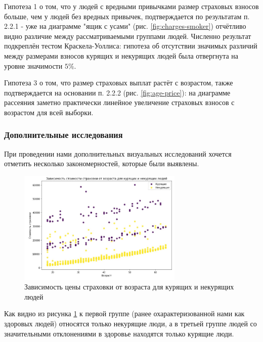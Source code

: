\documentclass[a4paper,12pt]{article}
\begin{document}
Гипотеза 1 о том, что у людей с вредными привычками размер страховых взносов больше, чем у людей без вредных привычек, подтверждается по результатам п. 2.2.1 - уже на диаграмме "ящик с усами" (рис. \ref{fig:charges-smoker}) отчётливо видно различие между рассматриваемыми группами людей. Численно результат подкреплён тестом Краскела-Уоллиса: гипотеза об отсутствии значимых различий между размерами взносов курящих и некурящих людей была отвергнута на уровне значимости $5\%$.

Гипотеза 3 о том, что размер страховых выплат растёт с возрастом, также подтверждается на основании п. 2.2.2 (рис. \ref{fig:age-price}): на диаграмме рассеяния заметно практически линейное увеличение страховых взносов с возрастом для всей выборки.

\subsubsection{Дополнительные исследования}

При проведении нами дополнительных визуальных исследований хочется отметить несколько закономерностей, которые были выявлены.

\begin{figure}[H]
	\includegraphics[width=0.7\textwidth]{../[graphics]/age-charges-smoker.jpg}
	\centering
	\caption{Зависимость цены страховки от возраста для курящих и некурящих людей}
	\label{fig:age-charges-smoker}
\end{figure}

Как видно из рисунка \ref{fig:age-charges-smoker} к первой группе (ранее охарактеризованной нами как здоровых людей) относятся только некурящие люди, а в третьей группе людей со значительными отклонениями в здоровье находятся только курящие люди.
\end{document}
